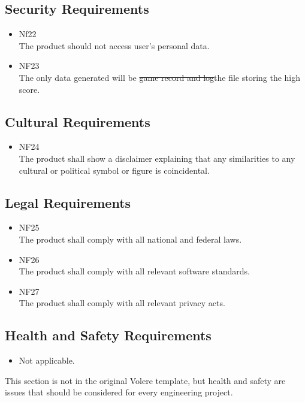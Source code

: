 \documentclass[12pt, titlepage]{article}
\begin{document}
\subsection{Security Requirements}
\begin{itemize}
    \item Nf{\color{red}22}\\
    The product should not access user's personal data.
	\item NF{\color{red}23}\\
	The only data generated will be \sout{game record and log}{\color{red}the file storing the high score}.
\end{itemize}
\subsection{Cultural Requirements}
\begin{itemize}
    \item NF{\color{red}24}\\
    The product shall show a disclaimer explaining that any similarities to any cultural or political symbol or figure is coincidental.
\end{itemize}
\subsection{Legal Requirements}
\begin{itemize}
    \item NF{\color{red}25}\\
    The product shall comply with all national and federal laws.
	\item NF{\color{red}26}\\
	The product shall comply with all relevant software standards.
 	\item NF{\color{red}27}\\
 	The product shall comply with all relevant privacy acts.
\end{itemize}
\subsection{Health and Safety Requirements}
\begin{itemize}
    \item Not applicable.
\end{itemize}
{\color{red}This section is not in the original Volere template, but health and safety are issues that should be considered for every engineering project.}
\end{document}
